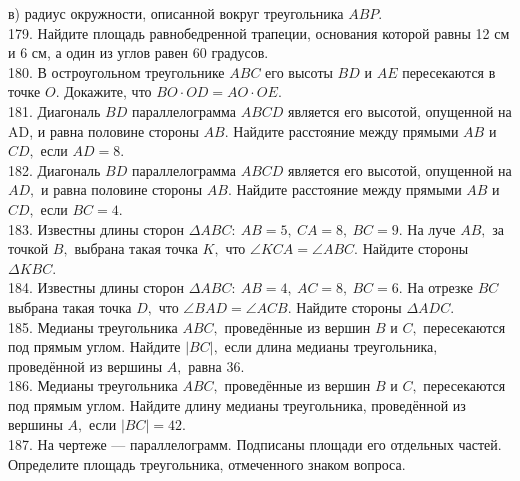 \documentclass[12pt]{article}
\begin{document}
в) радиус окружности, описанной вокруг треугольника $ABP.$\\
179. Найдите площадь равнобедренной трапеции, основания которой равны 12 см и 6 см, а один из углов равен 60 градусов.\\
180. В остроугольном треугольнике $ABC$ его высоты $BD$ и $AE$ пересекаются в точке $O.$ Докажите, что $BO\cdot OD=AO\cdot OE.$\\
181. Диагональ $BD$ параллелограмма $ABCD$ является его высотой, опущенной на AD, и равна половине стороны $AB.$ Найдите расстояние между прямыми $AB$ и $CD,$ если $AD = 8.$\\
182. Диагональ $BD$ параллелограмма $ABCD$ является его высотой, опущенной на $AD,$ и равна половине стороны $AB.$ Найдите расстояние между прямыми $AB$ и $CD,$ если $BC = 4.$\\
183. Известны длины сторон $\Delta ABC:\ AB = 5,\ CA = 8,\  BC = 9.$ На луче $AB,$ за точкой $B,$ выбрана такая точка $K,$ что $\angle KCA = \angle ABC.$ Найдите стороны $\Delta KBC.$\\
184. Известны длины сторон $\Delta ABC:\ AB = 4,\ AC = 8,\  BC = 6.$ На отрезке $BC$ выбрана такая точка $D,$ что $\angle BAD = \angle ACB.$ Найдите стороны $\Delta ADC.$\\
185. Медианы треугольника $ABC,$ проведённые из вершин $B$ и $C,$ пересекаются под прямым углом. Найдите $|BC|,$ если длина медианы треугольника, проведённой из вершины $A,$ равна 36.\\
186. Медианы треугольника $ABC,$ проведённые из вершин $B$ и $C,$ пересекаются под прямым углом. Найдите длину медианы треугольника, проведённой из вершины $A,$ если $|BC| = 42.$\\
187. На чертеже --- параллелограмм. Подписаны площади его отдельных частей. Определите площадь треугольника, отмеченного знаком вопроса.
\begin{figure}[ht!]
\end{figure}\\
\end{document}
